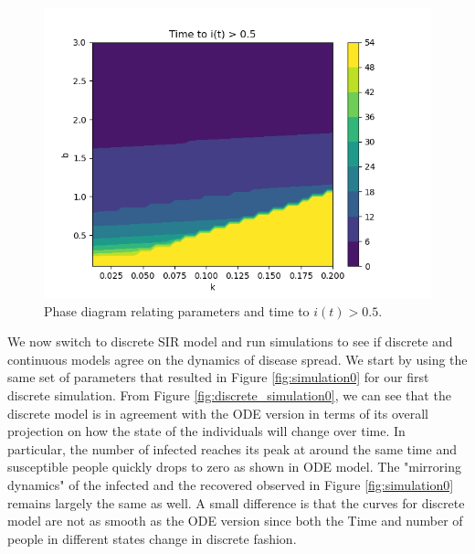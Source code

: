 \documentclass[12pt, reqno]{amsart}
\begin{document}
    \begin{figure}
        \centering
        \includegraphics[scale=0.8]{phase_transition_outnumber.png}
        \caption{Phase diagram relating parameters and time to \(i(t) > 0.5\).}
        \label{fig:phase_transition_outnumber}
    \end{figure}
    
    \newpage
    
     We now switch to discrete SIR model and run simulations to see if discrete and continuous models agree on the dynamics of disease spread. We start by using the same set of parameters that resulted in Figure \ref{fig:simulation0} for our first discrete simulation. From Figure \ref{fig:discrete_simulation0}, we can see that the discrete model is in agreement with the ODE version in terms of its overall projection on how the state of the individuals will change over time. In particular, the number of infected reaches its peak at around the same time and susceptible people quickly drops to zero as shown in ODE model. The "mirroring dynamics" of the infected and the recovered observed in Figure \ref{fig:simulation0} remains largely the same as well. A small difference is that the curves for discrete model are not as smooth as the ODE version since both the Time and number of people in different states change in discrete fashion. 
    
\end{document}
